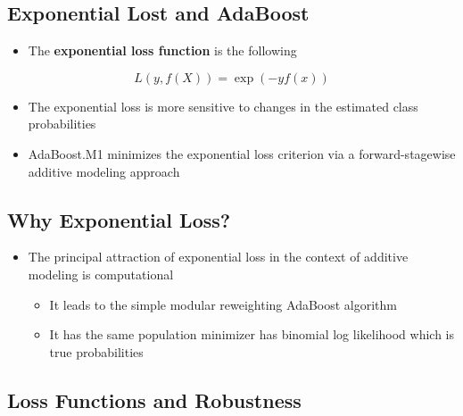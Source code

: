 \documentclass[11pt]{article}
\begin{document}
\subsection{Exponential Lost and AdaBoost}
\label{sec:org29ed69c}
\begin{itemize}
\item The \textbf{exponential loss function} is the following
\end{itemize}
\begin{equation}
	L(y,f(X))=\exp(-yf(x))
\end{equation}
\begin{itemize}
\item The exponential loss is more sensitive to changes in the estimated class probabilities

\item AdaBoost.M1 minimizes the exponential loss criterion via a forward-stagewise additive modeling approach
\end{itemize}

\subsection{Why Exponential Loss?}
\label{sec:org8fe7855}
\begin{itemize}
\item The principal attraction of exponential loss in the context of additive modeling is computational
\begin{itemize}
\item It leads to the simple modular reweighting AdaBoost algorithm
\item It has the same population minimizer has binomial log likelihood which is true probabilities
\end{itemize}
\end{itemize}

\subsection{Loss Functions and Robustness}
\label{sec:org9d89341}
\end{document}
